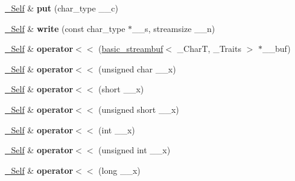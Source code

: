 \begin{DoxyCompactItemize}
\item 
\mbox{\label{classbasic__ostream_aa8ae9ad012357508ea7298ff212e69a6}} 
\hyperlink{classbasic__ostream}{\+\_\+\+Self} \& {\bfseries put} (char\+\_\+type \+\_\+\+\_\+c)
\item 
\mbox{\label{classbasic__ostream_aed5be9df66676ca9562ed8c6f8b46f89}} 
\hyperlink{classbasic__ostream}{\+\_\+\+Self} \& {\bfseries write} (const char\+\_\+type $\ast$\+\_\+\+\_\+s, streamsize \+\_\+\+\_\+n)
\item 
\mbox{\label{classbasic__ostream_aa7f17b83d1a510448e40d669cc5d9a24}} 
\hyperlink{classbasic__ostream}{\+\_\+\+Self} \& {\bfseries operator$<$$<$} (\hyperlink{classbasic__streambuf}{basic\+\_\+streambuf}$<$ \+\_\+\+CharT, \+\_\+\+Traits $>$ $\ast$\+\_\+\+\_\+buf)
\item 
\mbox{\label{classbasic__ostream_a91e48fddbc58240a213cbf9c9a29737d}} 
\hyperlink{classbasic__ostream}{\+\_\+\+Self} \& {\bfseries operator$<$$<$} (unsigned char \+\_\+\+\_\+x)
\item 
\mbox{\label{classbasic__ostream_a1eb08075527e945247934f13daeffdbf}} 
\hyperlink{classbasic__ostream}{\+\_\+\+Self} \& {\bfseries operator$<$$<$} (short \+\_\+\+\_\+x)
\item 
\mbox{\label{classbasic__ostream_ac9959f06499d83592b5a07fbc08f1af8}} 
\hyperlink{classbasic__ostream}{\+\_\+\+Self} \& {\bfseries operator$<$$<$} (unsigned short \+\_\+\+\_\+x)
\item 
\mbox{\label{classbasic__ostream_ab4c8e7dac6c838c5a29d68c2f7d43c7b}} 
\hyperlink{classbasic__ostream}{\+\_\+\+Self} \& {\bfseries operator$<$$<$} (int \+\_\+\+\_\+x)
\item 
\mbox{\label{classbasic__ostream_ab0e167601e3f0ea45881b674366d8666}} 
\hyperlink{classbasic__ostream}{\+\_\+\+Self} \& {\bfseries operator$<$$<$} (unsigned int \+\_\+\+\_\+x)
\item 
\mbox{\label{classbasic__ostream_ab47fa8942f6bd48168b70132059df516}} 
\hyperlink{classbasic__ostream}{\+\_\+\+Self} \& {\bfseries operator$<$$<$} (long \+\_\+\+\_\+x)

\end{DoxyCompactItemize}
